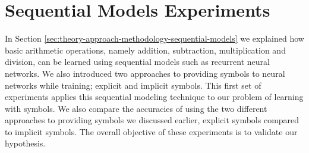 \section{Sequential Models Experiments} \label{sec:empirical-studies-sequential-models-experiments}

In Section \ref{sec:theory-approach-methodology-sequential-models} we explained how basic arithmetic operations, namely addition, subtraction, multiplication and division, can be learned using sequential models such as recurrent neural networks. We also introduced two approaches to providing symbols to neural networks while training; explicit and implicit symbols. This first set of experiments applies this sequential modeling technique to our problem of learning with symbols. We also compare the accuracies of using the two different approaches to providing symbols we discussed earlier, explicit symbols compared to implicit symbols. The overall objective of these experiments is to validate our hypothesis.





